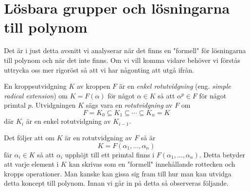 \documentclass{article}
\theoremstyle{definition}
\begin{document}
\section{Lösbara grupper och lösningarna till polynom}
Det är i just detta avsnitt vi analyserar när det finns en "formell" för lösningarna till polynom och när det inte finns. 
Om vi vill komma vidare behöver vi förstås uttrycka oss mer rigoröst så att vi har någonting att utgå ifrån.

\begin{mydef}{}{}
  En kroppsutvidgning $K$ av kroppen $F$ är en \textit{enkel rotutvidgning} (eng. \textit{simple radical extension}) om 
  $K = F(\alpha)$ för något $\alpha \in K$ så att $\alpha^p \in F$ för något primtal $p$. 
  Utvidgningen $K$ sägs vara en \textit{rotutvidgning} av $F$ om 
  \[F = K_0 \subseteq K_1 \subseteq \cdots \subseteq K_n = K \]
  där $K_i$ är en enkel rotutvidgning av $K_{i-1}$.
\end{mydef}
Det följer att om $K$ är en rotutvidgning av $F$ så är 
\[K = F(\alpha_1, \ldots, \alpha_n)\]
fär $\alpha_i \in K$ så att $\alpha_i$ upphöjt till ett primtal finns i $F(\alpha_1, \ldots, \alpha_n)$. Detta betyder 
att varje element i $K$ kan skrivas som en "formell" innehållande rottecken och kropps operationer. Man kanske kan 
gissa sig fram till hur man kan utvidga detta koncept till polynom. Innan vi går in på detta så observeras följande. 
\end{document}
